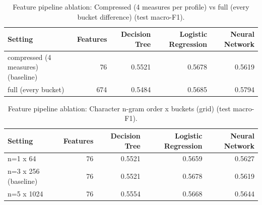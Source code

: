 \begin{table}[ht]
\centering
\small
\caption{Feature pipeline ablation: Compressed (4 measures per profile) vs full (every bucket difference) (test macro-F1).}
\label{tab:pipeline-block-differences}
\begin{tabular}{lrrrr}
\toprule
Setting & Features & Decision Tree & Logistic Regression & Neural Network \\
\midrule
compressed (4 measures) (baseline) & 76 & 0.5521 & 0.5678 & 0.5619 \\
full (every bucket) & 674 & 0.5484 & 0.5685 & 0.5794 \\
\bottomrule
\end{tabular}
\end{table}

\begin{table}[ht]
\centering
\small
\caption{Feature pipeline ablation: Character n-gram order x buckets (grid) (test macro-F1).}
\label{tab:pipeline-char-grid}
\begin{tabular}{lrrrr}
\toprule
Setting & Features & Decision Tree & Logistic Regression & Neural Network \\
\midrule
n=1 x 64 & 76 & 0.5521 & 0.5659 & 0.5627 \\
n=3 x 256 (baseline) & 76 & 0.5521 & 0.5678 & 0.5619 \\
n=5 x 1024 & 76 & 0.5554 & 0.5668 & 0.5644 \\
\bottomrule
\end{tabular}
\end{table}

